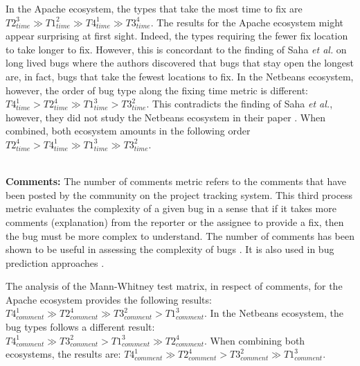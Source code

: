 In the Apache ecosystem, the types that take the most time to fix are  $T2_{time}^3
 \gg T1_{time}^2
 \gg T4_{time}^1
 \gg T3_{time}^4
$.
The results for the Apache ecosystem might appear surprising at first sight.
Indeed, the types requiring the fewer fix location to take longer to fix.
However, this is concordant to the finding of Saha {\it et al.} on long lived bugs \cite{Saha2014} where the authors discovered that bugs that stay open the longest are, in fact, bugs that take the fewest locations to fix.
In the Netbeans ecosystem, however, the order of bug type along the fixing time metric is different: $T4_{time}^1
 > T2_{time}^4
 \gg T1_{time}^3
 > T3_{time}^2
$.
This contradicts the finding of Saha {\it et al.}, however, they did not study the Netbeans ecosystem in their paper \cite{Saha2014}.
When combined, both ecosystem amounts in the following order
$
T2_{time}^4
 >
T4_{time}^1
 \gg
T1_{time}^3
 \gg
T3_{time}^2
$.

\\ \vspace{0.1cm} {\bf Comments: }
The number of comments metric refers to the comments that  have been posted by the community on the project tracking system.
This third process metric evaluates the complexity of a given bug in a sense that if it takes more comments (explanation) from the reporter or the assignee to provide a fix, then the bug must be more complex to understand.
The number of comments has been shown to be useful in assessing the complexity of bugs \cite{Zhang2013,Zhang2012}. 
It is also used in bug prediction approaches \cite{DAmbros2010,Bhattacharya2011}.

The analysis of the Mann-Whitney test matrix, in respect of comments, for the Apache ecosystem provides the following results:
$
T4_ {comment} ^1
 \gg
T2_{comment}^4
 \gg
T3_{comment}^2
 >
T1_{comment}^3
$.
In the Netbeans ecosystem, the bug types follows a different result:
$
T4_{comment}^1
 \gg
T3_{comment}^2
 >
T1_{comment}^3
 \gg
T2_{comment}^4
$.
When combining both ecosystems, the results are:
$
T4_{comment}^1
 \gg
T2_{comment}^4
 >
T3_{comment}^2
 \gg
T1_{comment}^3
$.

